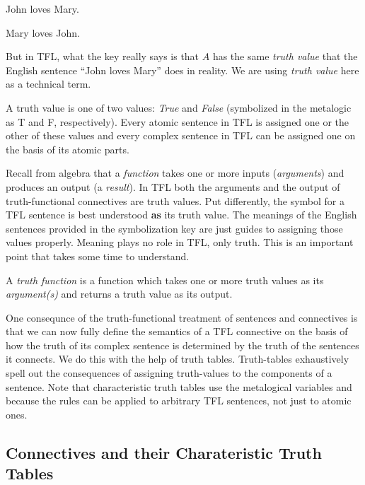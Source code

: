 \begin{argument}
\item[A:] John loves Mary.
\item[B:] Mary loves John.
\end{argument}

But in TFL, what the key really says is that $A$ has the same \emph{truth value}
that the English sentence ``John loves Mary'' does in reality. We are using
\emph{truth value} here as a technical term.

\begin{definition}
  A truth value is one of two values: \emph{True} and \emph{False} (symbolized
  in the metalogic as T and F, respectively). Every atomic sentence in TFL is
  assigned one or the other of these values and every complex sentence
  in TFL can be assigned one on the basis of its atomic parts.
\end{definition}

Recall from algebra that a \emph{function} takes one or more inputs
(\emph{arguments}) and produces an output (a \emph{result}). In TFL both the
arguments and the output of truth-functional connectives are truth values. Put
differently, the symbol for a TFL sentence is best understood \textbf{as} its
truth value. The meanings of the English sentences provided in the symbolization
key are just guides to assigning those values properly. Meaning plays no role in
TFL, only truth. This is an important point that takes some time to understand.

\begin{definition}
  A \emph{truth function} is a function which takes one or more truth values
  as its \emph{argument(s)} and returns a truth value as its output.
\end{definition}

One consequnce of the truth-functional treatment of sentences and connectives is
that we can now fully define the semantics of a TFL connective on the basis of
how the truth of its complex sentence is determined by the truth of the
sentences it connects. We do this with the help of truth tables. Truth-tables
exhaustively spell out the consequences of assigning truth-values to the
components of a sentence. Note that characteristic truth tables use the
metalogical variables \ephi and \epsi because the rules can be applied to
arbitrary TFL sentences, not just to atomic ones.

\subsection{Connectives and their Charateristic Truth Tables}

